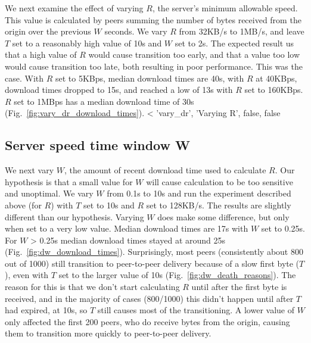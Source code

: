 We next examine the effect of varying $R$, the server's minimum allowable speed.  This value is calculated 
by peers summing the number of bytes received from the origin over the previous $W$ seconds. We vary $R$ from 32KB/s to 1MB/s, and leave $T$ set to a 
reasonably high value of 10s and $W$ set to 2s. The expected result us that a high value of $R$ would cause transition 
too early, and that a value too low would cause transition too late, both resulting in poor performance. This was the case.  With $R$ set 
to 5KBps, median download times are 40s, with $R$ at 40KBps, download times dropped to 15s, and reached 
a low of 13s with $R$ set to 160KBps. $R$ set to 1MBps has a median download time of 30s (Fig.~\ref{fig:vary_dr_download_times}). 
<%
  'vary_dr', 'Varying R', false, false %

\subsection{Server speed time window W}

We next vary $W$, the amount of recent download time used to calculate $R$. Our hypothesis is that 
a small value for $W$ will cause calculation to be too sensitive and unoptimal. We vary $W$ from 0.1s 
to 10s and run the experiment described above (for $R$) with $T$ set to 10s and $R$ set to 128KB/s. The results are 
slightly different than our hypothesis. Varying $W$ does make some difference, but only when set 
to a very low value. Median download times are 17s with $W$ set to 0.25s. For $W$ \textgreater{} 0.25s 
median download times stayed at around 25s (Fig.~\ref{fig:dw_download_times}). Surprisingly, 
most peers (consistently about 800 out of 1000) still transition to peer-to-peer delivery because of 
a slow first byte ($T$), even with $T$ set to the larger value of 10s (Fig.~\ref{fig:dw_death_reasons}). 
The reason for this is that we don't start calculating $R$ until after the first byte is received, and 
in the majority of cases (800/1000) this didn't happen until after $T$ had expired, at 10s, so $T$ still 
causes most of the transitioning. A lower value of $W$ only affected the first 
200 peers, who do receive bytes from the origin, causing them to transition more quickly to peer-to-peer delivery.


